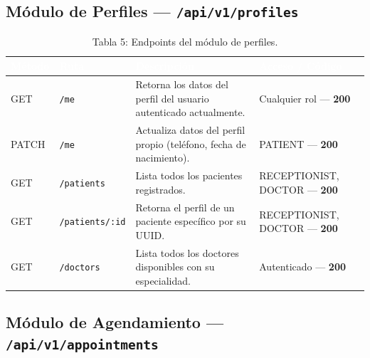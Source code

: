 \documentclass[a4paper,12pt]{article}
\renewcommand{\arraystretch}{1.1}
\begin{document}
\subsection{Módulo de Perfiles — \texttt{/api/v1/profiles}}

\begin{table}[H]
\centering
\small
\renewcommand{\arraystretch}{1.6}
\begin{tabular}{|p{1.6cm}|p{2.4cm}|p{5.8cm}|p{3.4cm}|}
\hline
\rowcolor{SKTPrimary}
\textcolor{white}{\textbf{Método}} &
\textcolor{white}{\textbf{Ruta}} &
\textcolor{white}{\textbf{Descripción}} &
\textcolor{white}{\textbf{Acceso / Código}} \\
\hline
\rowcolor{rowGET}
GET & \texttt{/me} & Retorna los datos del perfil del usuario autenticado actualmente. & Cualquier rol — \textbf{200} \\
\hline
\rowcolor{rowPATCH}
PATCH & \texttt{/me} & Actualiza datos del perfil propio (teléfono, fecha de nacimiento). & PATIENT — \textbf{200} \\
\hline
\rowcolor{rowGET}
GET & \texttt{/patients} & Lista todos los pacientes registrados. & RECEPTIONIST, DOCTOR — \textbf{200} \\
\hline
\rowcolor{rowGET}
GET & \texttt{/patients/:id} & Retorna el perfil de un paciente específico por su UUID. & RECEPTIONIST, DOCTOR — \textbf{200} \\
\hline
\rowcolor{rowGET}
GET & \texttt{/doctors} & Lista todos los doctores disponibles con su especialidad. & Autenticado — \textbf{200} \\
\hline
\end{tabular}
\caption*{Tabla 5: Endpoints del módulo de perfiles.}
\end{table}

\subsection{Módulo de Agendamiento — \texttt{/api/v1/appointments}}
\end{document}
